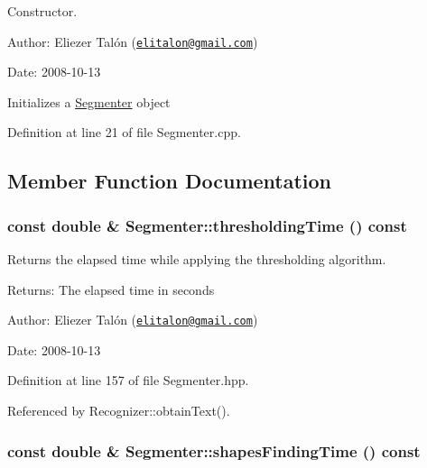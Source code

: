 Constructor. 

\begin{Desc}
\item[Author:]Eliezer Talón (\href{mailto:elitalon@gmail.com}{\tt elitalon@gmail.com}) \end{Desc}
\begin{Desc}
\item[Date:]2008-10-13\end{Desc}
Initializes a \hyperlink{class_segmenter}{Segmenter} object 

Definition at line 21 of file Segmenter.cpp.

\subsection{Member Function Documentation}
\hypertarget{class_segmenter_52f771c61d667df4f552ee73dc9f22e7}{
\subsubsection[thresholdingTime]{\setlength{\rightskip}{0pt plus 5cm}const double \& Segmenter::thresholdingTime () const}}
\label{class_segmenter_52f771c61d667df4f552ee73dc9f22e7}


Returns the elapsed time while applying the thresholding algorithm. 

\begin{Desc}
\item[Returns:]The elapsed time in seconds\end{Desc}
\begin{Desc}
\item[Author:]Eliezer Talón (\href{mailto:elitalon@gmail.com}{\tt elitalon@gmail.com}) \end{Desc}
\begin{Desc}
\item[Date:]2008-10-13 \end{Desc}


Definition at line 157 of file Segmenter.hpp.

Referenced by Recognizer::obtainText().\hypertarget{class_segmenter_53761a65661587c45e34988b90401888}{
\subsubsection[shapesFindingTime]{\setlength{\rightskip}{0pt plus 5cm}const double \& Segmenter::shapesFindingTime () const}}
\label{class_segmenter_53761a65661587c45e34988b90401888}


